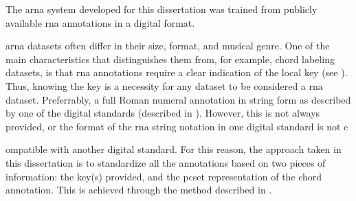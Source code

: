 

The \gls{arna} system developed for this dissertation was
trained from publicly available \gls{rna} annotations in a
digital format. 

\gls{arna} datasets often  differ in their size, format, and
musical genre. One of the main characteristics that
distinguishes them from, for example, chord labeling
datasets, is that \gls{rna} annotations require a clear
indication of the local key (see ).
Thus, knowing the key is a necessity for any dataset to be
considered a \gls{rna} dataset. Preferrably, a full Roman
numeral annotation in string form as described by one of the
digital standards (described in
). However, this is not
always provided, or the format of the \gls{rna} string
notation in one digital standard is not c

ompatible with another digital standard. For this reason,
the approach taken in this dissertation is to standardize
all the annotations based on two pieces of information: the
key(s) provided, and the \gls{pcset} representation of the
chord annotation. This is achieved through the method
described in
.
